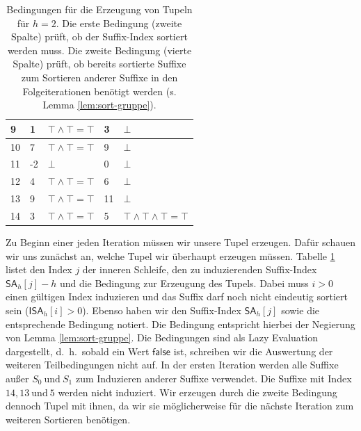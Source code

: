 \begin{table}[]
\begin{tabular}{|l|l|l|l|l|}
9   & 1               & $\top \wedge \top = \top$   & 3            & $\bot$                                                                                                                            \\ \hline
10  & 7               & $\top \wedge \top = \top$   & 9            & $\bot$                                                                                                                            \\ \hline
11  & -2              & $\bot$                      & 0            & $\bot$                                                                                                                            \\ \hline
12  & 4               & $\top \wedge \top = \top$   & 6            & $\bot$                                                                                                                            \\ \hline
13  & 9               & $\top \wedge \top = \top$   & 11           & $\bot$                                                                                                                            \\ \hline
14  & 3               & $\top \wedge \top = \top$   & 5            & $\top \wedge \top \wedge \top = \top$                                                                                             \\ \hline
\end{tabular}
\caption{Bedingungen für die Erzeugung von Tupeln für $h=2$. Die erste Bedingung (zweite Spalte) prüft, ob der Suffix-Index sortiert werden muss. Die zweite Bedingung (vierte Spalte) prüft, ob bereits sortierte Suffixe zum Sortieren anderer Suffixe in den Folgeiterationen benötigt werden (s. Lemma \ref{lem:sort-gruppe}).}
\label{tab:osipov-tupel-cond}
\end{table}

Zu Beginn einer jeden Iteration müssen wir unsere Tupel erzeugen. Dafür schauen wir uns zunächst an, welche Tupel wir überhaupt erzeugen müssen. Tabelle \ref{tab:osipov-tupel-cond} listet den Index $j$ der inneren Schleife, den zu induzierenden Suffix-Index $\mathsf{SA}_h[j]-h$ und die Bedingung zur Erzeugung des Tupels. Dabei muss $i>0$ einen gültigen Index induzieren und das Suffix darf noch nicht eindeutig sortiert sein ($\mathsf{ISA}_h[i] > 0$). Ebenso haben wir den Suffix-Index $\mathsf{SA}_h[j]$ sowie die entsprechende Bedingung notiert. Die Bedingung entspricht hierbei der Negierung von Lemma \ref{lem:sort-gruppe}. Die Bedingungen sind als Lazy Evaluation dargestellt, d.~h.\ sobald ein Wert $\mathsf{false}$ ist, schreiben wir die Auswertung der weiteren Teilbedingungen nicht auf. In der ersten Iteration werden alle Suffixe außer $S_0 ~\text{und}~ S_1$ zum Induzieren anderer Suffixe verwendet. Die Suffixe mit Index $14, 13 ~\text{und}~ 5$ werden nicht induziert. Wir erzeugen durch die zweite Bedingung dennoch Tupel mit ihnen, da wir sie möglicherweise für die nächste Iteration zum weiteren Sortieren benötigen.

